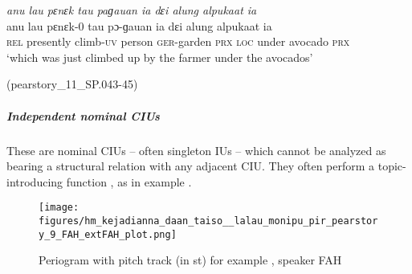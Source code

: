 \newpage
{}


{
	\ex
	\label{ex:anu lau penek tau pagauan ia dɛi alung alpokat ia}
	\textit{anu lau pɛnɛk tau paɡauan ia dɛi alung alpukaat ia} \\
	\gll anu lau pɛnɛk-0 tau pɔ-ɡauan ia dɛi alung alpukaat ia \\
	\textsc{rel} presently climb-\textsc{uv} person \textsc{ger-}garden \textsc{prx} \textsc{loc} under avocado \textsc{prx}\\
	\glt `which was just climbed up by the farmer under the avocados'
	\begin{flushright}(pearstory\_11\_SP.043-45)
		\end{flushright}
}
\z
\z

\subparagraph{Independent nominal CIUs}
\label{sec:independent-nominal-cius} 

These are nominal CIUs -- often singleton IUs -- which cannot be analyzed as bearing a structural relation with any adjacent CIU. They often perform a topic-introducing function \citep[13]{Croft_2007}, as in example . 


\begin{figure}
	\texttt{[image: figures/hm\_kejadianna\_daan\_taiso\_\_lalau\_monipu\_pir\_pearstory\_9\_FAH\_extFAH\_plot.png]}
	\caption{Periogram with pitch track (in st) for example , speaker FAH}
	\label{pitch:Independent nom IU}
\end{figure}




\ea
\label{ex:Independent nom IU}

\newpage
{}


